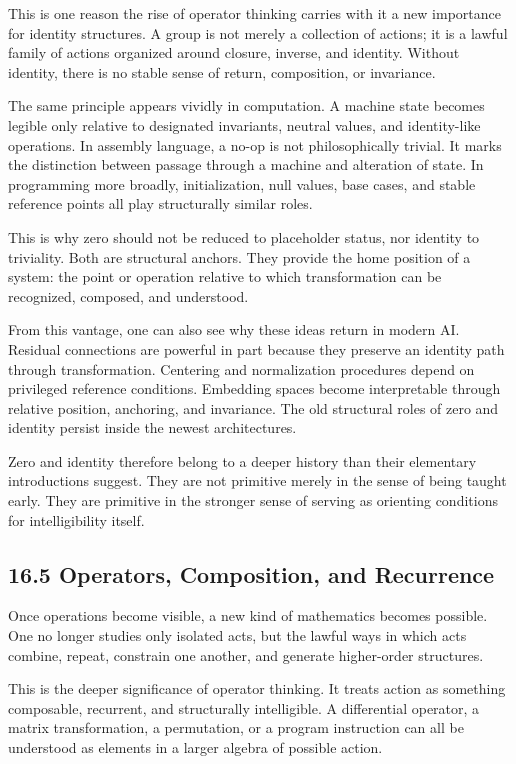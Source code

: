 This is one reason the rise of operator thinking carries with it a new
importance for identity structures. A group is not merely a collection
of actions; it is a lawful family of actions organized around closure,
inverse, and identity. Without identity, there is no stable sense of
return, composition, or invariance.

The same principle appears vividly in computation. A machine state
becomes legible only relative to designated invariants, neutral values,
and identity-like operations. In assembly language, a no-op is not
philosophically trivial. It marks the distinction between passage
through a machine and alteration of state. In programming more broadly,
initialization, null values, base cases, and stable reference points all
play structurally similar roles.

This is why zero should not be reduced to placeholder status, nor
identity to triviality. Both are structural anchors. They provide the
home position of a system: the point or operation relative to which
transformation can be recognized, composed, and understood.

From this vantage, one can also see why these ideas return in modern AI.
Residual connections are powerful in part because they preserve an
identity path through transformation. Centering and normalization
procedures depend on privileged reference conditions. Embedding spaces
become interpretable through relative position, anchoring, and
invariance. The old structural roles of zero and identity persist inside
the newest architectures.

Zero and identity therefore belong to a deeper history than their
elementary introductions suggest. They are not primitive merely in the
sense of being taught early. They are primitive in the stronger sense of
serving as orienting conditions for intelligibility itself.

\hypertarget{operators-composition-and-recurrence}{%
\subsection{16.5 Operators, Composition, and
Recurrence}\label{operators-composition-and-recurrence}}

Once operations become visible, a new kind of mathematics becomes
possible. One no longer studies only isolated acts, but the lawful ways
in which acts combine, repeat, constrain one another, and generate
higher-order structures.

This is the deeper significance of operator thinking. It treats action
as something composable, recurrent, and structurally intelligible. A
differential operator, a matrix transformation, a permutation, or a
program instruction can all be understood as elements in a larger
algebra of possible action.

